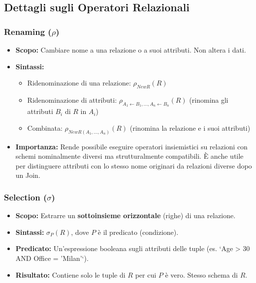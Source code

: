 \documentclass{article}
\newcommand{\selectop}[2]{\sigma_{#1}(#2)} %
\begin{document}
	\subsection{Dettagli sugli Operatori Relazionali}
	
	\subsubsection{Renaming ($\rho$)}
	\begin{itemize}
		\item \textbf{Scopo:} Cambiare nome a una relazione o a suoi attributi. Non altera i dati.
		\item \textbf{Sintassi:}
		\begin{itemize}
			\item Ridenominazione di una relazione: $\rho_{NewR}(R)$
			\item Ridenominazione di attributi: $\rho_{A_1 \leftarrow B_1, \dots, A_n \leftarrow B_n}(R)$ (rinomina gli attributi $B_i$ di $R$ in $A_i$)
			\item Combinata: $\rho_{NewR(A_1, \dots, A_n)}(R)$ (rinomina la relazione e i suoi attributi)
		\end{itemize}
		\item \textbf{Importanza:} Rende possibile eseguire operatori insiemistici su relazioni con schemi nominalmente diversi ma strutturalmente compatibili. È anche utile per distinguere attributi con lo stesso nome originari da relazioni diverse dopo un Join.
	\end{itemize}
	
	\subsubsection{Selection ($\sigma$)}
	\begin{itemize}
		\item \textbf{Scopo:} Estrarre un \textbf{sottoinsieme orizzontale} (righe) di una relazione.
		\item \textbf{Sintassi:} $\selectop{P}{R}$, dove $P$ è il predicato (condizione).
		\item \textbf{Predicato:} Un'espressione booleana sugli attributi delle tuple (es. `Age > 30 AND Office = 'Milan'`).
		\item \textbf{Risultato:} Contiene solo le tuple di $R$ per cui $P$ è vero. Stesso schema di $R$.
	\end{itemize}
	
\end{document}
